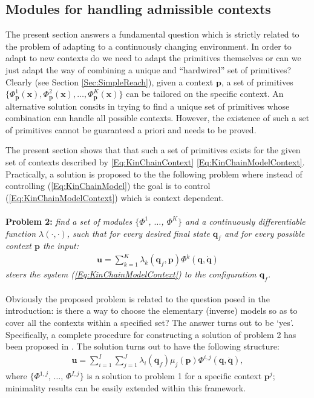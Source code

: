\documentclass{svmult}
\begin{document}
\subsection{Modules for handling admissible contexts} \label{Sec:ModContexts}

The present section answers a fundamental question which is 
strictly related to the problem of adapting to a continuously
changing environment. In order to adapt to new contexts do we need to adapt the 
primitives themselves or can we just adapt the way of combining
a unique and ``hardwired'' set of primitives?  Clearly (see Section 
\ref{Sec:SimpleReach}), given a context $\mathbf p$, a set of primitives 
$\{ \Phi^1_{\mathbf p}(\mathbf x), \Phi^2_{\mathbf p}(\mathbf x), \dots, 
\Phi^K_{\mathbf p}(\mathbf x)\}$ can be tailored  on the specific context. 
An alternative solution consits in  trying to find a unique set of primitives 
whose combination can handle all possible contexts. However, the existence 
of such a set of primitives cannot be guaranteed a priori and needs
to be proved.

The present section shows that that such a set of primitives exists
for the given set of contexts described by \eqref{Eq:KinChainContext}
\eqref{Eq:KinChainModelContext}. Practically, a solution is proposed
to the the following problem where
instead of controlling (\ref{Eq:KinChainModel}) the goal is to control
(\ref{Eq:KinChainModelContext}) which is context dependent.
\\
\\
\textbf{Problem 2:} {\em find a set of modules $\{\Phi^1$, $\dots$,
$\Phi^K\}$ and a continuously differentiable function
$\lambda(\cdot, \cdot)$, such that for every desired final state
$\mathbf q_f$ and for every possible context $\mathbf p$ the input:
\begin{eqnarray}
\mathbf u = \sum_{k=1}^K \lambda_k(\mathbf q_f, \mathbf p)
\Phi^k(\mathbf q, \dot{\mathbf q})
\end{eqnarray}
steers the system (\ref{Eq:KinChainModelContext}) to the configuration $\mathbf q_f$.}\\
\\
Obviously the proposed problem is related to the question posed in
the introduction: is there a way to choose the elementary (inverse)
models so as to cover all the contexts within a specified set? The
answer turns out to be `yes'. Specifically, a complete procedure for
constructing a solution of problem 2 has been proposed in
\cite{NoriPhDThesis}. The solution turns out to have the following
structure:
\begin{eqnarray} \label{Eq:BasicModelControlContext}
\mathbf u = \sum_{i = 1}^I \sum_{j = 1}^J \lambda_i(\mathbf q_f)
\mu_j(\mathbf p) \Phi^{i,j}(\mathbf q, \dot{\mathbf q}),
\end{eqnarray}
where $\{\Phi^{1,j}$, $\dots$, $\Phi^{I,j}\}$ is a solution to
problem 1 for a specific context $\mathbf p^j$; minimality results
can be easily extended within this framework.
\end{document}
